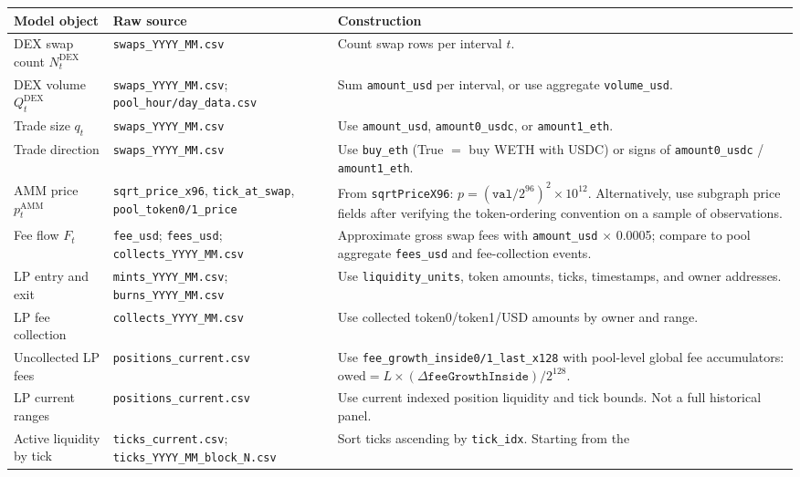 \documentclass[11pt,a4paper]{article}
\begin{document}
\begin{xltabular}{\linewidth}{L{4.0cm}L{4.0cm}Y}
\toprule
\textbf{Model object} & \textbf{Raw source} & \textbf{Construction} \\
\midrule
DEX swap count $N_t^{\mathrm{DEX}}$ &
  \texttt{swaps\_YYYY\_MM.csv} &
  Count swap rows per interval $t$. \\
DEX volume $Q_t^{\mathrm{DEX}}$ &
  \texttt{swaps\_YYYY\_MM.csv}; \texttt{pool\_hour/day\_data.csv} &
  Sum \texttt{amount\_usd} per interval, or use aggregate
  \texttt{volume\_usd}. \\
Trade size $q_t$ &
  \texttt{swaps\_YYYY\_MM.csv} &
  Use \texttt{amount\_usd}, \texttt{amount0\_usdc}, or
  \texttt{amount1\_eth}. \\
Trade direction &
  \texttt{swaps\_YYYY\_MM.csv} &
  Use \texttt{buy\_eth} (True $=$ buy WETH with USDC) or signs of
  \texttt{amount0\_usdc} / \texttt{amount1\_eth}. \\
AMM price $p_t^{\mathrm{AMM}}$ &
  \texttt{sqrt\_price\_x96}, \texttt{tick\_at\_swap},
  \texttt{pool\_token0/1\_price} &
  From \texttt{sqrtPriceX96}: $p = (\texttt{val}/2^{96})^{2} \times
  10^{12}$. Alternatively, use subgraph price fields after verifying the
  token-ordering convention on a sample of observations. \\
Fee flow $F_t$ &
  \texttt{fee\_usd}; \texttt{fees\_usd};
  \texttt{collects\_YYYY\_MM.csv} &
  Approximate gross swap fees with \texttt{amount\_usd} $\times$ 0.0005;
  compare to pool aggregate \texttt{fees\_usd} and fee-collection events. \\
LP entry and exit &
  \texttt{mints\_YYYY\_MM.csv}; \texttt{burns\_YYYY\_MM.csv} &
  Use \texttt{liquidity\_units}, token amounts, ticks, timestamps, and
  owner addresses. \\
LP fee collection &
  \texttt{collects\_YYYY\_MM.csv} &
  Use collected token0/token1/USD amounts by owner and range. \\
Uncollected LP fees &
  \texttt{positions\_current.csv} &
  Use \texttt{fee\_growth\_inside0/1\_last\_x128} with pool-level
  global fee accumulators: $\text{owed} = L \times (\Delta
  \texttt{feeGrowthInside}) / 2^{128}$. \\
LP current ranges &
  \texttt{positions\_current.csv} &
  Use current indexed position liquidity and tick bounds. Not a full
  historical panel. \\
Active liquidity by tick &
  \texttt{ticks\_current.csv};
  \texttt{ticks\_YYYY\_MM\_block\_N.csv} &
  Sort ticks ascending by \texttt{tick\_idx}. Starting from the

\end{xltabular}
\end{document}
